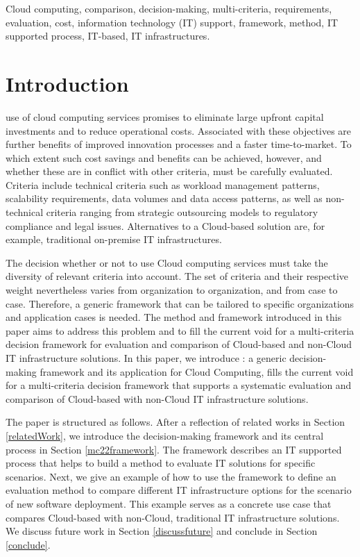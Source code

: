 \documentclass[journal,final,a4paper,twoside]{IEEEtran}
\begin{document}
\begin{IEEEkeywords}
Cloud computing, comparison, decision-making, multi-criteria, requirements, evaluation, cost, information technology (IT) support, framework, method, IT supported process, IT-based, IT infrastructures.
\end{IEEEkeywords}






\IEEEpeerreviewmaketitle



\section{Introduction}
 use of cloud computing services promises to eliminate large upfront capital investments and to reduce operational costs. Associated with these objectives are further benefits of improved innovation processes and a faster time-to-market. To which extent such cost savings and benefits can be achieved, however, and whether these are in conflict with other criteria, must be carefully evaluated. Criteria include technical criteria such as workload management patterns, scalability requirements, data volumes and data access patterns, as well as non-technical criteria ranging from strategic outsourcing models to regulatory compliance and legal issues. Alternatives to a Cloud-based solution are, for example, traditional on-premise IT infrastructures.

The decision whether or not to use Cloud computing services must take the diversity of relevant criteria into account. The set of criteria and their respective weight nevertheless varies from organization to organization, and from case to case. Therefore, a generic framework that can be tailored to specific organizations and application cases is needed.  The  method and framework introduced in this paper aims to address this problem and to fill the current void for a multi-criteria decision framework for evaluation and comparison of Cloud-based and non-Cloud IT infrastructure solutions.
In this paper, we introduce : a generic decision-making framework and its application for Cloud Computing,  fills the current void for a multi-criteria decision framework that supports a systematic evaluation and comparison of Cloud-based with non-Cloud IT infrastructure solutions.

The paper is structured as follows. After a reflection of related works in Section \ref{relatedWork}, we introduce the decision-making framework and its central process in Section \ref{mc22framework}. The framework describes an IT supported process that helps to build a method to evaluate IT solutions for specific scenarios. Next, we give an example of how to use the framework to define an evaluation method to compare different IT infrastructure options for the scenario of new software deployment. This example serves as a concrete use case that compares Cloud-based with non-Cloud, traditional IT infrastructure solutions. We discuss future work in Section \ref{discussfuture} and conclude in Section \ref{conclude}. 
\end{document}
